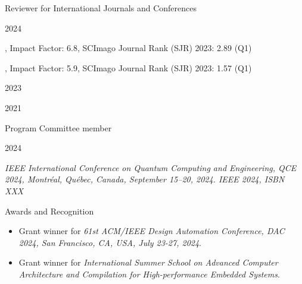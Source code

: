 \documentclass[
	a4paper, %
	10pt, %
]{tresume} %
\begin{document}
%
\begin{tSection}{Reviewer for International Journals and Conferences}
  \begin{tSubsection}{2024}{}{}{}
  \item {}
  \item {}, Impact Factor: 6.8, SCImago Journal Rank (SJR) 2023: 2.89 (Q1)
  \item {}, Impact Factor: 5.9, SCImago Journal Rank (SJR) 2023:
    1.57 (Q1)
  \end{tSubsection}
  \begin{tSubsection}{2023}{}{}{}
  \item {}
  \item {}
  \end{tSubsection}
  \begin{tSubsection}{2021}{}{}{}
  \item {}
  \end{tSubsection}
\end{tSection}
%
\begin{tSection}{Program Committee member}
  \begin{tSubsection}{2024}{}{}{}
  \item \emph{IEEE International Conference on Quantum Computing and
      Engineering, QCE 2024, Montréal, Québec, Canada, September 15–20, 2024. IEEE
      2024, ISBN XXX}
\end{tSubsection}
\end{tSection}
%
\begin{tSection}{Awards and Recognition}
  \begin{itemize}
  \item[2024] Grant winner for \emph{61st ACM/IEEE Design Automation
      Conference, DAC 2024, San Francisco, CA, USA, July 23-27,
      2024}.
  \item[2021] Grant winner for \emph{International Summer School on Advanced
      Computer Architecture and Compilation for High-performance Embedded
      Systems}.
  \end{itemize}
\end{tSection}
\vfill
\ifpublic{%
    \ifgdpr{%
    
    
  }
  \fi
}
\fi
\end{document}
